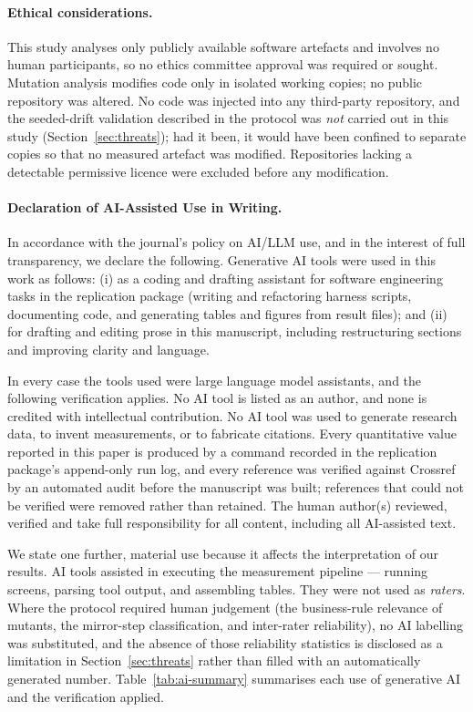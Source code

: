 \begin{declarations}
\begin{furtherinformation}
\paragraph{Ethical considerations.}
This study analyses only publicly available software artefacts and involves no human participants, so
no ethics committee approval was required or sought. Mutation analysis modifies code only in isolated
working copies; no public repository was altered. No code was injected into any third-party
repository, and the seeded-drift validation described in the protocol was \emph{not} carried out in
this study (Section~\ref{sec:threats}); had it been, it would have been confined to separate copies so
that no measured artefact was modified. Repositories lacking a detectable permissive licence were
excluded before any modification.

\paragraph{Declaration of AI-Assisted Use in Writing.}
In accordance with the journal's policy on AI/LLM use, and in the interest of full transparency, we
declare the following. Generative AI tools were used in this work as follows: (i) as a coding and
drafting assistant for software engineering tasks in the replication package (writing and refactoring
harness scripts, documenting code, and generating tables and figures from result files); and (ii) for
drafting and editing prose in this manuscript, including restructuring sections and improving clarity
and language.

In every case the tools used were large language model assistants, and the following verification
applies. No AI tool is listed as an author, and none is credited with intellectual contribution. No
AI tool was used to generate research data, to invent measurements, or to fabricate citations. Every
quantitative value reported in this paper is produced by a command recorded in the replication
package's append-only run log, and every reference was verified against Crossref by an automated
audit before the manuscript was built; references that could not be verified were removed rather than
retained. The human author(s) reviewed, verified and take full responsibility for all content,
including all AI-assisted text.

We state one further, material use because it affects the interpretation of our results. AI tools
assisted in executing the measurement pipeline --- running screens, parsing tool output, and
assembling tables. They were not used as \emph{raters}. Where the protocol required human judgement
(the business-rule relevance of mutants, the mirror-step classification, and inter-rater reliability),
no AI labelling was substituted, and the absence of those reliability statistics is disclosed as a
limitation in Section~\ref{sec:threats} rather than filled with an automatically generated number.
Table~\ref{tab:ai-summary} summarises each use of generative AI and the verification applied.


\end{furtherinformation}
\end{declarations}
